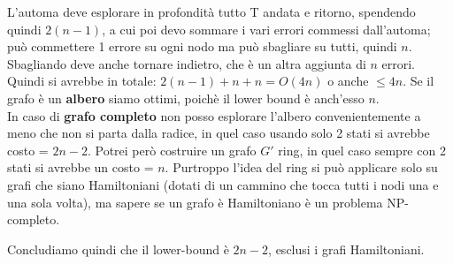 L'automa deve esplorare in profondità tutto T andata e ritorno, spendendo quindi $2(n-1)$, a cui poi devo sommare i vari errori commessi dall'automa; può commettere 1 errore su ogni nodo ma può sbagliare su tutti, quindi $n$. Sbagliando deve anche tornare indietro, che è un altra aggiunta di $n$ errori. Quindi si avrebbe in totale: $2(n-1)+n+n = O(4n) $ o anche $\leq 4n$.
Se il grafo è un \textbf{albero} siamo ottimi, poichè il lower bound è anch'esso $n$.\\
In caso di \textbf{grafo completo} non posso esplorare l'albero convenientemente a meno che non si parta dalla radice, in quel caso usando solo 2 stati si avrebbe costo = $2n-2$.
Potrei però costruire un grafo $G'$ ring, in quel caso sempre con 2 stati si avrebbe un costo = $n$.
Purtroppo l'idea del ring si può applicare solo su grafi che siano Hamiltoniani (dotati di un cammino che tocca tutti i nodi una e una sola volta), ma sapere se un grafo è Hamiltoniano è un problema NP-completo.

Concludiamo quindi che il lower-bound è $2n-2$, esclusi i grafi Hamiltoniani.

